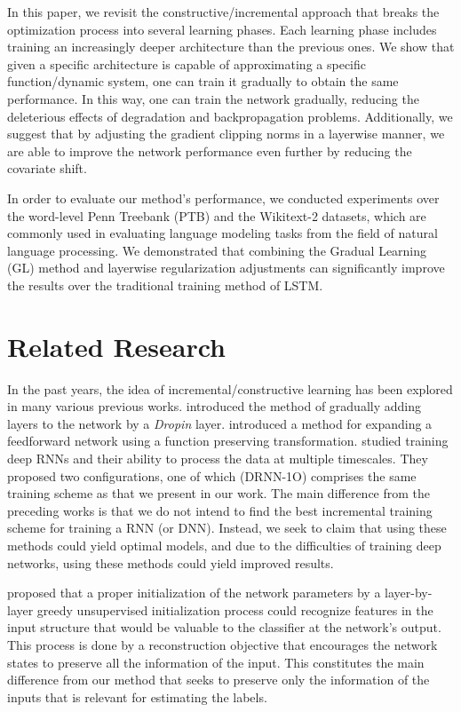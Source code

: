 \documentclass{article}
\begin{document}
\par In this paper, we revisit the constructive/incremental approach that breaks the optimization process into several learning phases. Each learning phase includes training an increasingly deeper architecture than the previous ones. 
We show that given a specific architecture is capable of approximating a specific function/dynamic system, one can train it gradually to obtain the same performance.
In this way, one can train the network gradually, reducing the deleterious effects of degradation and backpropagation problems. Additionally, we suggest that by adjusting the gradient clipping norms in a layerwise manner, we are able to improve the network performance even further by reducing the covariate shift.

In order to evaluate our method's performance, we conducted experiments over the word-level Penn Treebank (PTB) and the Wikitext-2 datasets, which are commonly used in evaluating language modeling tasks from the field of natural language processing. 
We demonstrated that combining the Gradual Learning (GL) method and layerwise regularization adjustments can significantly improve the results over the traditional training method of LSTM.  

\section{Related Research}


In the past years, the idea of incremental/constructive learning has been explored in many various previous works.
\citet{Dropin} introduced the method of gradually adding layers to the network by a \textit{Dropin} layer. 
\citet{net2net} introduced a method for expanding a feedforward network using a function preserving transformation. 
\citet{TrainingAnalysingDRNN} studied training deep RNNs and their ability to process the data at multiple timescales. 
They proposed two configurations, one of which (DRNN-1O) comprises the same training scheme as that we present in our work. 
The main difference from the preceding works is that we do not intend to find the best incremental training scheme for training a RNN (or DNN). Instead, we seek to claim that using these methods could yield optimal models, and due to the difficulties of training deep networks, using these methods could yield improved results.

\citet{GreedyLayerwiseInit} proposed that a proper initialization of the network parameters by a layer-by-layer greedy unsupervised initialization process could recognize features in the input structure that would be valuable to the classifier at the network's output. This process is done by a reconstruction objective that encourages the network states to preserve all the information of the input. This constitutes the main difference from our method that seeks to preserve only the information of the inputs that is relevant for estimating the labels.
\end{document}
